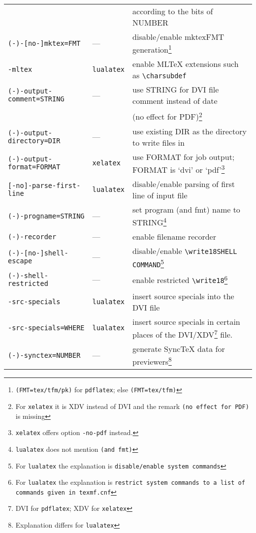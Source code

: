 \documentclass{article}
\newcommand{\pdflatex}{\texttt{pdflatex}}
\newcommand{\lualatex}{\texttt{lualatex}}
\newcommand{\xelatex}{\texttt{xelatex}}
\begin{document}
{\begin{longtable}{|lll|}
                                   &             & according to the bits of NUMBER \\
\texttt{(-)-[no-]mktex=FMT}        & ---         & disable/enable mktexFMT generation\footnote%
{\texttt{(FMT=tex/tfm/pk)} for \pdflatex; else \texttt{(FMT=tex/tfm)}} \\
\texttt{-mltex}                    & \lualatex{} & enable MLTeX extensions such as \texttt{\textbackslash{}charsubdef} \\
\texttt{(-)-output-comment=STRING} & ---         & use STRING for DVI file comment instead of date \\
                                   &             & (no effect for PDF)\footnote%
{For \xelatex{} it is XDV instead of DVI and the remark \texttt{(no effect for PDF)} is missing} \\
\texttt{(-)-output-directory=DIR}  & ---         & use existing DIR as the directory to write files in \\
\texttt{(-)-output-format=FORMAT}     & \xelatex{}  & use FORMAT for job output; FORMAT is `dvi' or `pdf'\footnote%
{\xelatex{} offers option \texttt{-no-pdf} instead. } \\
\texttt{[-no]-parse-first-line}    & \lualatex{} & disable/enable parsing of first line of input file \\
\texttt{(-)-progname=STRING}       & ---         & set program (and fmt) name to STRING\footnote%
{\lualatex{} does not mention \texttt{(and fmt)}} \\
\texttt{(-)-recorder}              & ---         & enable filename recorder \\
\texttt{(-)-[no-]shell-escape}     & ---         & disable/enable \texttt{\textbackslash{}write18{SHELL COMMAND}}\footnote%
{For \lualatex{} the explanation is \texttt{disable/enable system commands}} \\
\texttt{(-)-shell-restricted}      & ---         & enable restricted \texttt{\textbackslash{}write18}\footnote%
{For \lualatex{} the explanation is \texttt{restrict system commands to a list of commands given in texmf.cnf}} \\
\texttt{-src-specials}             & \lualatex{} & insert source specials into the DVI file \\
\texttt{-src-specials=WHERE}       & \lualatex{} & insert source specials in certain places of
                          the DVI/XDV\footnote{DVI for \pdflatex; XDV for \xelatex} file. \\
\texttt{(-)-synctex=NUMBER}        & ---         & generate SyncTeX data for previewers\footnote%
{Explanation differs for \lualatex} \\ 
                        

           
\end{longtable}
} %
\end{document}
